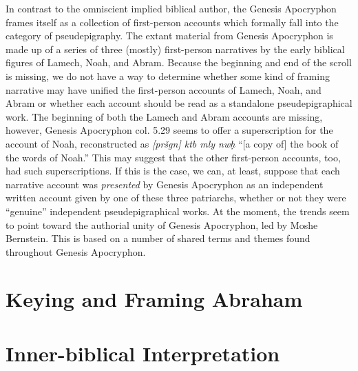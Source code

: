 In contrast to the omniscient implied biblical author, the
Genesis Apocryphon frames itself as a collection of first-person
accounts which formally fall into the category of pseudepigraphy. The
extant material from Genesis Apocryphon is made up of a series of three
(mostly) first-person narratives by the early biblical figures of
Lamech, Noah, and Abram. Because the beginning and end of the scroll is
missing, we do not have a way to determine whether some kind of framing
narrative may have unified the first-person accounts of Lamech, Noah,
and Abram or whether each account should be read as a standalone
pseudepigraphical work. The beginning of both the Lamech and Abram
accounts are missing, however, Genesis Apocryphon col. 5.29 seems to
offer a superscription for the account of Noah, reconstructed as
\emph{{[}pršgn{]} ktb mly nwḥ} ``{[}a copy of{]} the book of the words
of Noah.'' This may suggest that the other first-person accounts, too,
had such superscriptions. If this is the case, we can, at least, suppose
that each narrative account was \emph{presented} by Genesis Apocryphon
as an independent written account given by one of these three
patriarchs, whether or not they were ``genuine'' independent
pseudepigraphical works. At the moment, the trends seem to point toward
the authorial unity of Genesis Apocryphon, led by Moshe Bernstein. This
is based on a number of shared terms and themes found throughout
Genesis Apocryphon.\autocite{bernstein_jbl2009}

\hypertarget{keying-and-framing-abraham}{%
\section{Keying and Framing Abraham}\label{keying-and-framing-abraham}}

\hypertarget{inner-biblical-interpretation}{%
\section{Inner-biblical
Interpretation}\label{inner-biblical-interpretation}}
